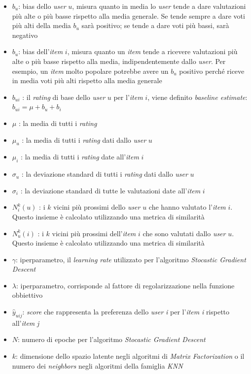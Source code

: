 \begin{itemize}
    \item $b_u$: bias dello \textit{user} $u$, misura quanto in media lo \textit{user} tende a dare valutazioni più alte o più basse rispetto alla media generale. Se tende sempre a dare voti più alti della media $b_u$ sarà positivo; se tende a dare voti più bassi, sarà negativo
    \item $b_u$: bias dell'\textit{item} $i$, misura quanto un \textit{item} tende a ricevere valutazioni più alte o più basse rispetto alla media, indipendentemente dallo \textit{user}. Per esempio, un \textit{item} molto popolare potrebbe avere un $b_u$ positivo perché riceve in media voti più alti rispetto alla media generale
    \item $b_{ui}$ : il \textit{rating} di base dello \textit{user} $u$ per l'\textit{item} $i$, viene definito \textit{baseline estimate}: $b_{ui} = \mu + b_u + b_i$
    \item $\mu$ : la media di tutti i \textit{rating}
    \item $\mu_u$ : la media di tutti i \textit{rating} dati dallo \textit{user} $u$
    \item $\mu_i$ : la media di tutti i \textit{rating} date all'\textit{item} $i$
    \item $\sigma_u$ : la deviazione standard di tutti i \textit{rating} dati dallo \textit{user} $u$
    \item $\sigma_i$ : la deviazione standard di tutte le valutazioni date all'\textit{item} $i$
    \item $N_i^k(u)$ : i $k$ vicini più prossimi dello \textit{user} $u$ che hanno valutato l'\textit{item} $i$. Questo insieme è calcolato utilizzando una metrica di similarità
    \item $N_u^k(i)$ : i $k$ vicini più prossimi dell'\textit{item} $i$ che sono valutati dallo \textit{user} $u$. Questo insieme è calcolato utilizzando una metrica di similarità
    \item $\gamma$: iperparametro, il \textit{learning rate} utilizzato per l'algoritmo \textit{Stocastic Gradient Descent}
    \item $\lambda$: iperparametro, corrisponde al fattore di regolarizzazione nella funzione obbiettivo
    \item $\hat{y}_{uij}$: \textit{score} che rappresenta la preferenza dello \textit{user} \textit{i} per l'\textit{item} \textit{i} rispetto all'\textit{item} \textit{j}
    \item $N$: numero di epoche per l'algoritmo \textit{Stocastic Gradient Descent}
    \item $k$: dimensione dello spazio latente negli algoritmi di \textit{Matrix Factorization} o il numero dei \textit{neighbors} negli algoritmi della famiglia \textit{KNN}
\end{itemize}


